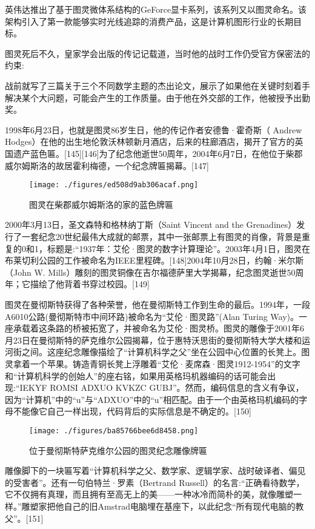 英伟达推出了基于图灵微体系结构的GeForce显卡系列，该系列又以图灵命名。该架构引入了第一款能够实时光线追踪的消费产品，这是计算机图形行业的长期目标。

图灵死后不久，皇家学会出版的传记记载道，当时他的战时工作仍受官方保密法的约束:

战前就写了三篇关于三个不同数学主题的杰出论文，展示了如果他在关键时刻着手解决某个大问题，可能会产生的工作质量。由于他在外交部的工作，他被授予出勤奖。

1998年6月23日，也就是图灵86岁生日，他的传记作者安德鲁·霍奇斯（ Andrew Hodges）在他的出生地伦敦沃林顿新月酒店，后来的柱廊酒店，揭开了官方的英国遗产蓝色匾。[145][146]为了纪念他逝世50周年，2004年6月7日，在他位于柴郡威尔姆斯洛的故居霍利梅德，一个纪念牌匾揭幕。[147]
\begin{figure}[ht]
\centering
\texttt{[image: ./figures/ed508d9ab306acaf.png]}
\caption{图灵在柴郡威尔姆斯洛的家的蓝色牌匾} \label{fig_ALTL_9}
\end{figure}
2000年3月13日，圣文森特和格林纳丁斯（Saint Vincent and the Grenadines）发行了一套纪念20世纪最伟大成就的邮票，其中一张邮票上有图灵的肖像，背景是重复的0和1，标题是:“1937年：艾伦·图灵的数字计算理论”。2003年4月1日，图灵在布莱切利公园的工作被命名为IEEE里程碑。[148]2004年10月28日，约翰·米尔斯（John W. Mills）雕刻的图灵铜像在吉尔福德萨里大学揭幕，纪念图灵逝世50周年；它描绘了他背着书穿过校园。[149]

图灵在曼彻斯特获得了各种荣誉，他在曼彻斯特工作到生命的最后。1994年，一段A6010公路(曼彻斯特市中间环路)被命名为“艾伦·图灵路”(Alan Turing Way)。一座承载着这条路的桥被拓宽了，并被命名为艾伦·图灵桥。图灵的雕像于2001年6月23日在曼彻斯特的萨克维尔公园揭幕，位于惠特沃思街的曼彻斯特大学大楼和运河街之间。这座纪念雕像描绘了“计算机科学之父”坐在公园中心位置的长凳上。图灵拿着一个苹果。铸造青铜长凳上浮雕着“艾伦·麦席森·图灵1912-1954”的文字和“计算机科学的创始人”的座右铭，如果用英格玛机器编码的话可能会出现:“IEKYF ROMSI ADXUO KVKZC GUBJ”。然而，编码信息的含义有争议，因为“计算机”中的“u”与“ADXUO”中的“u”相匹配。由于一个由英格玛机编码的字母不能像它自己一样出现，代码背后的实际信息是不确定的。[150]
\begin{figure}[ht]
\centering
\texttt{[image: ./figures/ba85766bee6d8458.png]}
\caption{位于曼彻斯特萨克维尔公园的图灵纪念雕像牌匾} \label{fig_ALTL_10}
\end{figure}
雕像脚下的一块匾写着“计算机科学之父、数学家、逻辑学家、战时破译者、偏见的受害者”。还有一句伯特兰·罗素（Bertrand Russell）的名言:“正确看待数学，它不仅拥有真理，而且拥有至高无上的美——一种冰冷而简朴的美，就像雕塑一样。”雕塑家把他自己的旧Amstrad电脑埋在基座下，以此纪念“所有现代电脑的教父”。[151]

